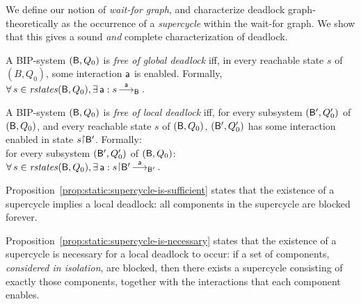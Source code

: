 
We define our notion of \emph{wait-for graph}, and characterize deadlock graph-theoretically as
the occurrence of a \emph{supercycle} within the wait-for graph. We show that this gives a sound \emph{and} complete characterization of deadlock.


\label{def:static:deadlock-free}
\label{def:global.deadlock-free} 
\label{defn:static:deadlock-free}
\label{defn:global.deadlock-free} 
A BIP-system $(\mathsf{B}, Q_0)$ is \emph{free of global deadlock} iff,
in every reachable state $s$ of $(B, Q_0)$, some interaction $\mathsf{a}$ is enabled.
Formally, $\forall\, s \in \mathit{rstates}(\mathsf{B},Q_0), \exists\, \mathsf{a} : s \mbox{$\, \stackrel{\mathsf{a}}{\longrightarrow}_{\mathsf{B}} \,$}$.
\ed


\label{def:local.deadlock-free} 
\label{defn:local.deadlock-free} 
A BIP-system $(\mathsf{B}, Q_0)$ is \emph{free of local deadlock} iff, 
for every subsystem $(\mathsf{B}', Q'_0)$ of  $(\mathsf{B}, Q_0)$, and every reachable state $s$ of $(\mathsf{B}, Q_0)$,
$(\mathsf{B}', Q'_0)$ has some interaction enabled in state $s \pj \B'$.
Formally:\\
\ind for every subsystem $(\mathsf{B}', Q'_0)$ of  $(\mathsf{B}, Q_0)$:\\
\ind \ind $\fa s \in \rstates{\B,Q_0},  \ex \act : s \pj \B' \enb{\act}{\B'}$.
\ed


Proposition~\ref{prop:static:supercycle-is-sufficient} states that the
existence of a supercycle implies a local deadlock: all components in
the supercycle are blocked forever.

Proposition~\ref{prop:static:supercycle-is-necessary} states that the
existence of a supercycle is necessary for a local deadlock to occur:
if a set of components, \emph{considered in isolation}, are blocked,
then there exists a supercycle consisting of exactly those components,
together with the interactions that each component enables.




